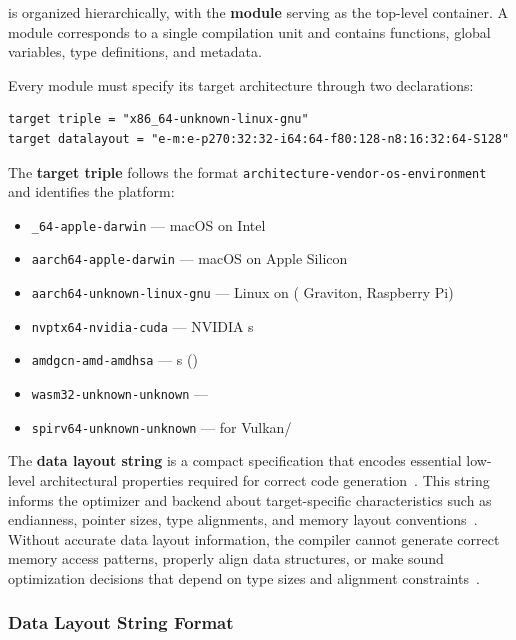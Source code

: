   is organized hierarchically, with the \textbf{module} serving as the top-level container. A module corresponds to a single compilation unit and contains functions, global variables, type definitions, and metadata.

Every module must specify its target architecture through two declarations:

\begin{lstlisting}[style=ir]
target triple = "x86_64-unknown-linux-gnu"
target datalayout = "e-m:e-p270:32:32-i64:64-f80:128-n8:16:32:64-S128"
\end{lstlisting}

The \textbf{target triple} follows the format \texttt{architecture-vendor-os-environment} and identifies the platform:

\begin{itemize}[noitemsep]
  \item \texttt{\_64-apple-darwin} --- macOS on Intel
  \item \texttt{aarch64-apple-darwin} --- macOS on Apple Silicon
  \item \texttt{aarch64-unknown-linux-gnu} --- Linux on  ( Graviton, Raspberry Pi)
  \item \texttt{nvptx64-nvidia-cuda} --- NVIDIA s
  \item \texttt{amdgcn-amd-amdhsa} ---  s ()
  \item \texttt{wasm32-unknown-unknown} --- 
  \item \texttt{spirv64-unknown-unknown} ---  for Vulkan/
\end{itemize}

The \textbf{data layout string} is a compact specification that encodes essential low-level architectural properties required for correct code generation~\cite{llvmlangref}. This string informs the  optimizer and backend about target-specific characteristics such as endianness, pointer sizes, type alignments, and memory layout conventions~\cite{lopesauler2014}. Without accurate data layout information, the compiler cannot generate correct memory access patterns, properly align data structures, or make sound optimization decisions that depend on type sizes and alignment constraints~\cite{llvmessentials}.

\subsubsection*{Data Layout String Format}

